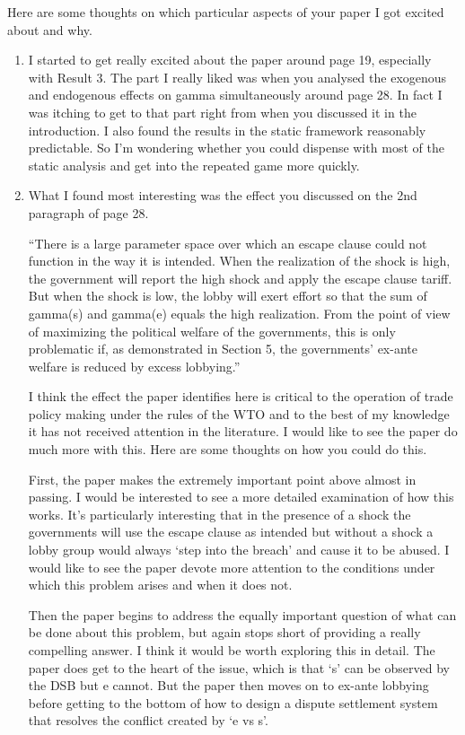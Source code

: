 \documentclass[12pt]{article}
\begin{document}
 
Here are some thoughts on which particular aspects of your paper I got excited about and why.
\begin{enumerate}
	\item I started to get really excited about the paper around page 19, especially with Result 3.  The part I really liked was when you analysed the exogenous and endogenous effects on gamma simultaneously around page 28.  In fact I was itching to get to that part right from when you discussed it in the introduction.  I also found the results in the static framework reasonably predictable.  So I'm wondering whether you could dispense with most of the static analysis and get into the repeated game more quickly.
 
	\item What I found most interesting was the effect you discussed on the 2nd paragraph of page 28. 
 
``There is a large parameter space over which an escape clause could not function in the way it is intended. When the realization of the shock is high, the government will report the high shock and apply the escape clause tariff. But when the shock is low, the lobby will exert effort so that the sum of gamma(s) and gamma(e) equals the high realization. From the point of view of maximizing the political welfare of the governments, this is only problematic if, as demonstrated in Section 5, the governments' ex-ante welfare is reduced by excess lobbying.''
 
I think the effect the paper identifies here is critical to the operation of trade policy making under the rules of the WTO and to the best of my knowledge it has not received attention in the literature.  I would like to see the paper do much more with this.  Here are some thoughts on how you could do this.
 
First, the paper makes the extremely important point above almost in passing.  I would be interested to see a more detailed examination of how this works.  It's particularly interesting that in the presence of a shock the governments will use the escape clause as intended but without a shock a lobby group would always `step into the breach' and cause it to be abused.  I would like to see the paper devote more attention to the conditions under which this problem arises and when it does not.
 
Then the paper begins to address the equally important question of what can be done about this problem, but again stops short of providing a really compelling answer.  I think it would be worth exploring this in detail.  The paper does get to the heart of the issue, which is that `s' can be observed by the DSB but e cannot.  But the paper then moves on to ex-ante lobbying before getting to the bottom of how to design a dispute settlement system that resolves the conflict created by `e vs s'.
 

\end{enumerate}
\end{document}
